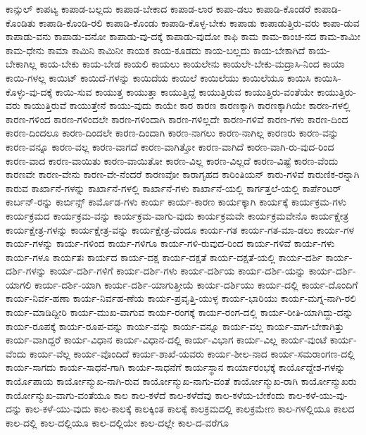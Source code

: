 {ಕಾನ್ಸುಲ್
ಕಾಪಟ್ಯ
ಕಾಪಾಡ-ಬಲ್ಲದು
ಕಾಪಾಡ-ಬೇಕಾದ
ಕಾಪಾಡ-ಲಾರ
ಕಾಪಾ-ಡಲು
ಕಾಪಾಡಿ-ಕೊಂಡರೆ
ಕಾಪಾಡಿ-ಕೊಂಡಿತು
ಕಾಪಾಡಿ-ಕೊಂಡಿ-ರಲಿ
ಕಾಪಾಡಿ-ಕೊಂಡು
ಕಾಪಾಡಿ-ಕೊಳ್ಳ-ಬೇಕು
ಕಾಪಾಡು
ಕಾಪಾಡುತ್ತಿರು-ವರು
ಕಾಪಾ-ಡುವ
ಕಾಪಾಡು-ವನು
ಕಾಪಾಡು-ವನೋ
ಕಾಪಾಡು-ವು-ದಕ್ಕೆ
ಕಾಪಾಡು-ವುದೋ
ಕಾಫಿ
ಕಾಮ
ಕಾಮ-ಕಾಂಚ-ನದ
ಕಾಮ-ಕಾಮೀ
ಕಾಮ-ಧೇನು
ಕಾಮಾ
ಕಾಮಿನಿ
ಕಾಮಿನೀ
ಕಾಯಕ
ಕಾಯ-ಕೂಡದು
ಕಾಯ-ಬಲ್ಲದು
ಕಾಯ-ಬೇಕಾಗಿದೆ
ಕಾಯ-ಬೇಕಾಗಿಲ್ಲ
ಕಾಯ-ಬೇಕು
ಕಾಯ-ಬೇಡ
ಕಾಯಲಿ
ಕಾಯಲು
ಕಾಯಲೇನು
ಕಾಯಲೇ-ಬೇಕು-ಮದ್ರಾಸಿ-ನಿಂದ
ಕಾಯಾ
ಕಾಯಿ-ಗಳಲ್ಲ
ಕಾಯಿಟ್
ಕಾಯಿದೆ-ಗಳನ್ನು
ಕಾಯಿದೆಯ
ಕಾಯಿಲೆ
ಕಾಯಿಲೆಯು
ಕಾಯಿಲೆಯೂ
ಕಾಯಿಸಿ
ಕಾಯಿಸಿ-ಕೊಳ್ಳು-ವು-ದಕ್ಕೆ
ಕಾಯಿ-ಸುವ
ಕಾಯುತ್ತ
ಕಾಯುತ್ತಾ
ಕಾಯುತ್ತಿದ್ದೆ
ಕಾಯುತ್ತಿರುವ
ಕಾಯುತ್ತಿರು-ವಂತೆಯೇ
ಕಾಯುತ್ತಿರು-ವರು
ಕಾಯುತ್ತಿರುವೆ
ಕಾಯುತ್ತೇನೆ
ಕಾಯು-ವುದು
ಕಾಯೇ
ಕಾರ
ಕಾರಣ
ಕಾರಣಕ್ಕಾಗಿ
ಕಾರಣಕ್ಕಾಗಿಯೇ
ಕಾರಣ-ಗಳಲ್ಲಿ
ಕಾರಣ-ಗಳಿಂದ
ಕಾರಣ-ಗಳಿಂದಲೇ
ಕಾರಣ-ಗಳಿಂದಾಗಿ
ಕಾರಣ-ಗಳಿಲ್ಲದೇ
ಕಾರಣ-ಗಳಿವೆ
ಕಾರಣ-ಗಳು
ಕಾರಣ-ದಿಂದ
ಕಾರಣ-ದಿಂದಲೂ
ಕಾರಣ-ದಿಂದಲೇ
ಕಾರಣ-ದಿಂದಾಗಿ
ಕಾರಣ-ನಾಗಲು
ಕಾರಣ-ನಾಗಿಲ್ಲ
ಕಾರಣರು
ಕಾರಣ-ವನ್ನು
ಕಾರಣ-ವನ್ನೂ
ಕಾರಣ-ವಲ್ಲ
ಕಾರಣ-ವಾಗದೆ
ಕಾರಣ-ವಾಗಿತ್ತೋ
ಕಾರಣ-ವಾಗಿದೆ
ಕಾರಣ-ವಾಗಿ-ರು-ವುದ-ರಿಂದ
ಕಾರಣ-ವಾದ
ಕಾರಣ-ವಾಯಿತು
ಕಾರಣ-ವಾಯಿತೋ
ಕಾರಣ-ವಿಲ್ಲ
ಕಾರಣ-ವಿಲ್ಲದೆ
ಕಾರಣ-ವಿಷ್ಟೆ
ಕಾರಣ-ವೆಂದು
ಕಾರಣವೇ
ಕಾರಣ-ವೇನು
ಕಾರಣ-ವೇ-ನೆಂದರೆ
ಕಾರಣವೋ
ಕಾರಾಗೃಹದ
ಕಾರಿಂತಿಯನ್‌
ಕಾರು-ಗಳಿವೆ
ಕಾರುಣಿಕ-ರನ್ನಾಗಿ
ಕಾರುವ
ಕಾರ್ಖಾನೆ-ಗಳನ್ನು
ಕಾರ್ಖಾನೆ-ಗಳಲ್ಲಿ
ಕಾರ್ಖಾನೆ-ಗಳು
ಕಾರ್ಖಾನೆ-ಯಲ್ಲಿ
ಕಾರ್ಗತ್ತಲೆ-ಯಲ್ಲಿ
ಕಾರ್ಪೆಂಟರ್
ಕಾರ್ಬನ್‌-ರನ್ನು
ಕಾರ್ಬಿನ್ಸ್
ಕಾರ್ಮೊಡ-ಗಳು
ಕಾರ್ಯ
ಕಾರ್ಯ-ಕಾರಣ
ಕಾರ್ಯಕ್ಕಾಗಿ
ಕಾರ್ಯಕ್ಕೆ
ಕಾರ್ಯಕ್ರಮ-ಗಳು
ಕಾರ್ಯಕ್ರಮದ
ಕಾರ್ಯಕ್ರಮ-ವನ್ನು
ಕಾರ್ಯಕ್ರಮ-ವಾಗು-ವುದು
ಕಾರ್ಯಕ್ರಮವೇ
ಕಾರ್ಯಕ್ರಮವೇನೊ
ಕಾರ್ಯಕ್ಷೇತ್ರ
ಕಾರ್ಯಕ್ಷೇತ್ರ-ಗಳನ್ನು
ಕಾರ್ಯಕ್ಷೇತ್ರ-ವನ್ನು
ಕಾರ್ಯಕ್ಷೇತ್ರ-ವೆಂದೂ
ಕಾರ್ಯ-ಗತ
ಕಾರ್ಯ-ಗತ-ಮಾ-ಡಲು
ಕಾರ್ಯ-ಗಳ
ಕಾರ್ಯ-ಗಳನ್ನು
ಕಾರ್ಯ-ಗಳಿಂದ
ಕಾರ್ಯ-ಗಳಿಗೂ
ಕಾರ್ಯ-ಗಳಿ-ರುವುದ-ರಿಂದ
ಕಾರ್ಯ-ಗಳಿವೆ
ಕಾರ್ಯ-ಗಳು
ಕಾರ್ಯ-ಗಳೂ
ಕಾರ್ಯತಃ
ಕಾರ್ಯದ
ಕಾರ್ಯ-ದಕ್ಷ
ಕಾರ್ಯ-ದಕ್ಷತೆ
ಕಾರ್ಯ-ದಕ್ಷತೆ-ಯಲ್ಲಿ
ಕಾರ್ಯ-ದರ್ಶಿ
ಕಾರ್ಯ-ದರ್ಶಿ-ಗಳನ್ನು
ಕಾರ್ಯ-ದರ್ಶಿ-ಗಳಿಗೆ
ಕಾರ್ಯ-ದರ್ಶಿ-ಗಳು
ಕಾರ್ಯ-ದರ್ಶಿಯ
ಕಾರ್ಯ-ದರ್ಶಿ-ಯನ್ನು
ಕಾರ್ಯ-ದರ್ಶಿ-ಯಾಗಲಿ
ಕಾರ್ಯ-ದರ್ಶಿ-ಯಾಗಿ
ಕಾರ್ಯ-ದರ್ಶಿ-ಯಾಗುತ್ತೀಯೆ
ಕಾರ್ಯ-ದರ್ಶಿಯು
ಕಾರ್ಯ-ದಲ್ಲಿ
ಕಾರ್ಯ-ದೊಂದಿಗೆ
ಕಾರ್ಯ-ನಿರ್ವ-ಹಣಾ
ಕಾರ್ಯ-ನಿರ್ವಹ-ಣೆಯ
ಕಾರ್ಯ-ಪ್ರವೃತ್ತಿ-ಯುಳ್ಳ
ಕಾರ್ಯ-ಭಾರಿಯು
ಕಾರ್ಯ-ಮಗ್ನ-ನಾಗಿ-ರಲಿ
ಕಾರ್ಯ-ಮಾಡಿದ್ದೀರಿ
ಕಾರ್ಯ-ಮುಖ-ವಾಗುವ
ಕಾರ್ಯ-ರಂಗಕ್ಕೆ
ಕಾರ್ಯ-ರಂಗ-ದಲ್ಲಿ
ಕಾರ್ಯ-ರೀತಿ-ಯಾಗಿದ್ದು-ದನ್ನು
ಕಾರ್ಯ-ರೂಪಕ್ಕೆ
ಕಾರ್ಯ-ರೂಪ-ವನ್ನು
ಕಾರ್ಯ-ವನ್ನು
ಕಾರ್ಯ-ವನ್ನೂ
ಕಾರ್ಯ-ವಲ್ಲ
ಕಾರ್ಯ-ವಾಗ-ಬೇಕಾಗಿತ್ತು
ಕಾರ್ಯ-ವಾಗಿದ್ದರೆ
ಕಾರ್ಯ-ವಿಧಾನ
ಕಾರ್ಯ-ವಿಧಾನ-ದಲ್ಲಿ
ಕಾರ್ಯ-ವಿಭಾಗ
ಕಾರ್ಯ-ವಿಲ್ಲ
ಕಾರ್ಯ-ವುಂಟೆ
ಕಾರ್ಯ-ವೆಂದು
ಕಾರ್ಯ-ವೆಲ್ಲ
ಕಾರ್ಯ-ವೊಂದಿದೆ
ಕಾರ್ಯ-ಶಾಖೆ-ಯವರು
ಕಾರ್ಯ-ಶೀಲ-ನಾದ
ಕಾರ್ಯ-ಸಮರಾಂಗಣ-ದಲ್ಲಿ
ಕಾರ್ಯ-ಸಾಗದು
ಕಾರ್ಯ-ಸಾಧನೆ-ಗಾಗಿ
ಕಾರ್ಯ-ಸಾಧನೆಗೆ
ಕಾರ್ಯಸ್ಥಾನ
ಕಾರ್ಯಾರಂಭಕ್ಕೆ
ಕಾರ್ಯೊದ್ದೇಶ-ಗಳನ್ನು
ಕಾರ್ಯೊಪಾಯ
ಕಾರ್ಯೋನ್ಮುಖ-ನಾಗಿ-ರುವ
ಕಾರ್ಯೋನ್ಮುಖ-ನಾಗು-ವಂತೆ
ಕಾರ್ಯೋನ್ಮುಖ-ರಾಗಿ
ಕಾರ್ಯೋನ್ಮುಖರು
ಕಾರ್ಯೋನ್ಮುಖ-ವಾಗು-ವಂತೆಯೂ
ಕಾಲ
ಕಾಲ-ಕಳೆದೆ
ಕಾಲ-ಕಳೆದೆವು
ಕಾಲ-ಕಳೆಯ-ಬೇಕೆಂದು
ಕಾಲ-ಕಳೆ-ಯು-ವು-ದನ್ನು
ಕಾಲ-ಕಳೆ-ಯು-ವುದು
ಕಾಲ-ಕಾಲಕ್ಕೆ
ಕಾಲಕ್ಕಿಂತ
ಕಾಲಕ್ಕೆ
ಕಾಲಕ್ರಮದಲ್ಲಿ
ಕಾಲಕ್ರಮೇಣ
ಕಾಲ-ಗಳಲ್ಲಿಯೂ
ಕಾಲದ
ಕಾಲ-ದಲ್ಲಿ
ಕಾಲ-ದಲ್ಲಿಯೂ
ಕಾಲ-ದಲ್ಲಿಯೇ
ಕಾಲ-ದಲ್ಲೇ
ಕಾಲ-ದ-ವರೆಗೂ
}

